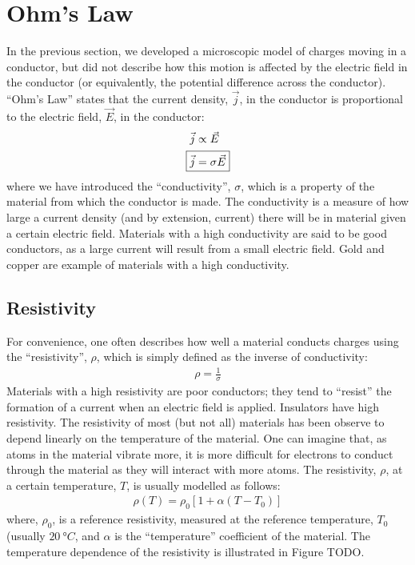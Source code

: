
\section{Ohm's Law}
In the previous section, we developed a microscopic model of charges moving in a conductor, but did not describe how this motion is affected by the electric field in the conductor (or equivalently, the potential difference across the conductor). ``Ohm's Law'' states that the current density, $\vec j$, in the conductor is proportional to the electric field, $\vec E$, in the conductor:
\begin{align*}
\vec j &\propto \vec E\\
\Aboxed{\vec j &= \sigma \vec E}
\end{align*}
where we have introduced the ``conductivity'', $\sigma$, which is a property of the material from which the conductor is made. The conductivity is a measure of how large a current density (and by extension, current) there will be in material given a certain electric field. Materials with a high conductivity are said to be good conductors, as a large current will result from a small electric field. Gold and copper are example of materials with a high conductivity. 
\subsection{Resistivity}
For convenience, one often describes how well a material conducts charges using the ``resistivity'', $\rho$, which is simply defined as the inverse of conductivity:
\begin{align*}
\rho = \frac{1}{\sigma}
\end{align*}
Materials with a high resistivity are poor conductors; they tend to ``resist'' the formation of a current when an electric field is applied. Insulators have high resistivity. The resistivity of most (but not all) materials has been observe to depend linearly on the temperature of the material. One can imagine that, as atoms in the material vibrate more, it is more difficult for electrons to conduct through the material as they will interact with more atoms. The resistivity, $\rho$, at a certain temperature, $T$, is usually modelled as follows:
\begin{align*}
\rho(T)=\rho_0\left[ 1 + \alpha (T-T_0)\right]
\end{align*}
where, $\rho_0$, is a reference resistivity, measured at the reference temperature, $T_0$ (usually $\SI{20}{\degree C}$, and $\alpha$ is the ``temperature'' coefficient of the material. The temperature dependence of the resistivity is illustrated in Figure TODO.


